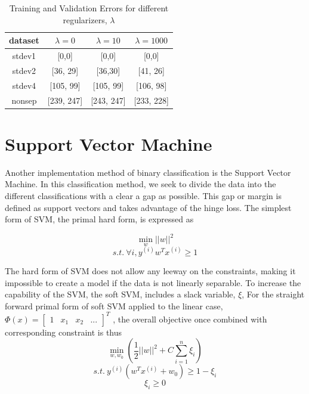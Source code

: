 \documentclass[10pt,twocolumn]{article}
\begin{document}
 \begin{table}
 \caption{ Training and Validation Errors for different regularizers, $\lambda$}
  \begin{tabular}{ | c | c | c | c |}
 \hline
 dataset &$ \lambda=0 $& $\lambda=10$ & $\lambda=1000$ \\ \hline 
 stdev1 & [0,0] & [0,0] & [0,0] \\ \hline
 stdev2 & [36, 29] & [36,30] & [41, 26] \\ \hline
 stdev4 & [105, 99] & [105, 99] & [106, 98] \\ \hline 
 nonsep & [239, 247] & [243, 247] & [233, 228] \\ \hline
 \end{tabular}
 \label{LR error}
\end{table}
 
 
 
 \section{Support Vector Machine}
 
 Another implementation method of binary classification is the Support Vector Machine. In this classification method, we seek to divide the data into the different classifications with a clear a gap as possible. This gap or margin is defined as support vectors and takes advantage of the hinge loss.  The simplest form of SVM, the primal hard form, is expressed as 

 \begin{equation}
\min_w ||w||^2
\end{equation}
\begin{equation}
s.t. \: \forall i, y^{(i)}w^T x^{(i)} \geq 1 
 \end{equation}
    
 The hard form of SVM does not allow any leeway on the constraints, making it impossible to create a model if the data is not linearly separable. To increase the capability of the SVM, the soft SVM, includes a slack variable, $\xi$, For the straight forward primal form of soft SVM applied to the linear case,  $\Phi(x)= \begin{bmatrix} 1 & x _1 & x_2 & ... \end{bmatrix}^T$ , the overall objective once combined with corresponding constraint is thus
 \begin{equation}
 \min_{w, w_0} (\frac{1}{2} ||w||^2 + C \sum_{i=1}^n \xi_i)
 \end{equation}
 \begin{equation}
 s.t. \: y^{(i)}(w^Tx^{(i)} + w_0) \geq 1 -\xi_i
 \end{equation}   
 \begin{equation}
 \xi_i \geq 0
 \end{equation}
    
\end{document}
